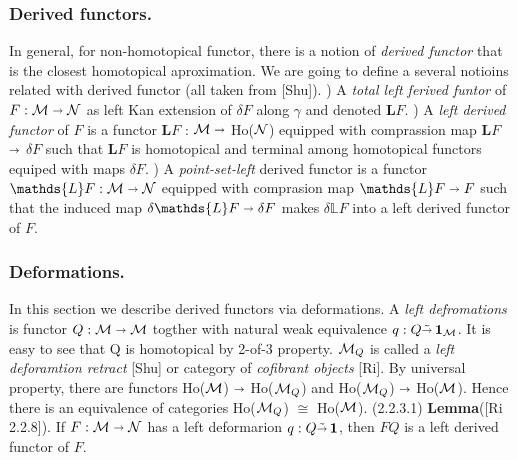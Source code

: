 		\subsubsection{Derived functors.}
		In general, for non-homotopical functor, there is a notion of \textit{derived functor} that is the closest homotopical aproximation. We are going to define a several notioins related with derived functor (all taken from [Shu]). 
		\newline
		) A \textit{total left ferived funtor} of $F : \mathcal{M} \shortrightarrow \mathcal{N} $ as  left Kan extension of $\delta F$ along $\gamma$ 
		and denoted \textbf{L}$F$. 
		) A \textit{left derived functor} of $F$ is a functor $\textbf{L} F$ : $\mathcal{M} \shortrightarrow $ Ho($\mathcal{N}$)
		equipped with comprassion map $\textbf{L} F$ $\shortrightarrow$ $\delta F$ such that $\textbf{L} F$ is homotopical and terminal among
		homotopical functors equiped with maps $\delta F$.
		) A \textit{point-set-left} derived functor is a functor $ \mathds{L} F : \mc{M} \rarr \mc{N} $ equipped with comprasion
		map $ \mathds{L} F \rarr F $ such that the induced map $ \delta \mathds{L} F \rarr \delta F $ makes $ \delta \mathds{L} F $
		into a left derived functor of $F$. 
       \subsubsection{Deformations.}
       In this section we describe derived functors via deformations.
       \newline
       \newline
       A \textit{left defromations} is functor $ Q : \mathcal{M} \shortrightarrow \mathcal{M} $ togther with natural weak equivalence 
       $ q : Q \tilde{\shortrightarrow} \operatorname*{\textbf{1}}_{\mathcal{M}} $. It is easy to see that Q is homotopical by 2-of-3 property. $\mathcal{M}_{Q}$ is
       called a \textit{left deforamtion retract} [Shu] or category of \textit{cofibrant objects} [Ri].
       By universal property, there are functors Ho($\mathcal{M}$) $\shortrightarrow$ Ho($\mathcal{M}_{Q}$) and Ho($\mathcal{M}_{Q}$) $\shortrightarrow$ Ho($\mathcal{M}$).
       Hence there is an equivalence of categories Ho($\mathcal{M}_{Q}$) $\cong$ Ho($\mathcal{M}$).
       \newline
       \newline
       (2.2.3.1) \textbf{Lemma}([Ri 2.2.8]). If $ F : \mathcal{M} \shortrightarrow \mathcal{N} $ has a left deformarion $ q : Q \tilde{\shortrightarrow} \operatorname*{\textbf{1}} $, then
       $ F Q $ is a left derived functor of $F$.

